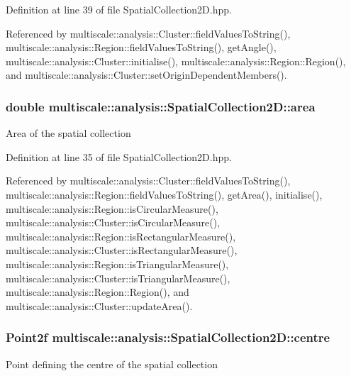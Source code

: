 Definition at line 39 of file Spatial\-Collection2\-D.\-hpp.



Referenced by multiscale\-::analysis\-::\-Cluster\-::field\-Values\-To\-String(), multiscale\-::analysis\-::\-Region\-::field\-Values\-To\-String(), get\-Angle(), multiscale\-::analysis\-::\-Cluster\-::initialise(), multiscale\-::analysis\-::\-Region\-::\-Region(), and multiscale\-::analysis\-::\-Cluster\-::set\-Origin\-Dependent\-Members().

\hypertarget{classmultiscale_1_1analysis_1_1SpatialCollection2D_ac570cc755e52aeb9deacf12d223a4a3a}{
\subsubsection[{area}]{\setlength{\rightskip}{0pt plus 5cm}double multiscale\-::analysis\-::\-Spatial\-Collection2\-D\-::area\hspace{0.3cm}{\ttfamily [protected]}}}\label{classmultiscale_1_1analysis_1_1SpatialCollection2D_ac570cc755e52aeb9deacf12d223a4a3a}
Area of the spatial collection 

Definition at line 35 of file Spatial\-Collection2\-D.\-hpp.



Referenced by multiscale\-::analysis\-::\-Cluster\-::field\-Values\-To\-String(), multiscale\-::analysis\-::\-Region\-::field\-Values\-To\-String(), get\-Area(), initialise(), multiscale\-::analysis\-::\-Region\-::is\-Circular\-Measure(), multiscale\-::analysis\-::\-Cluster\-::is\-Circular\-Measure(), multiscale\-::analysis\-::\-Region\-::is\-Rectangular\-Measure(), multiscale\-::analysis\-::\-Cluster\-::is\-Rectangular\-Measure(), multiscale\-::analysis\-::\-Region\-::is\-Triangular\-Measure(), multiscale\-::analysis\-::\-Cluster\-::is\-Triangular\-Measure(), multiscale\-::analysis\-::\-Region\-::\-Region(), and multiscale\-::analysis\-::\-Cluster\-::update\-Area().

\hypertarget{classmultiscale_1_1analysis_1_1SpatialCollection2D_afe9ef6b70ff53161cb02749444ae372c}{
\subsubsection[{centre}]{\setlength{\rightskip}{0pt plus 5cm}Point2f multiscale\-::analysis\-::\-Spatial\-Collection2\-D\-::centre\hspace{0.3cm}{\ttfamily [protected]}}}\label{classmultiscale_1_1analysis_1_1SpatialCollection2D_afe9ef6b70ff53161cb02749444ae372c}
Point defining the centre of the spatial collection 

